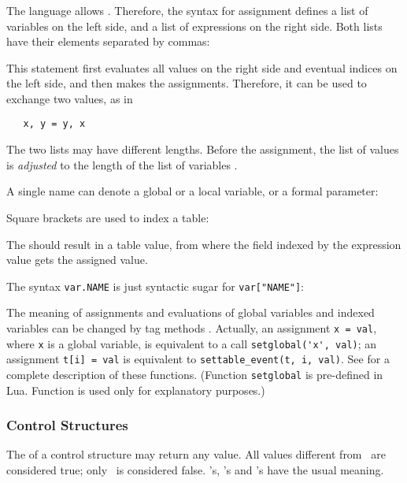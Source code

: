 \subsubsection{} \label{assignment}
The language allows .
Therefore, the syntax for assignment
defines a list of variables on the left side,
and a list of expressions on the right side.
Both lists have their elements separated by commas:
\begin{Produc}
\end{Produc}%
This statement first evaluates all values on the right side
and eventual indices on the left side,
and then makes the assignments.
Therefore, it can be used to exchange two values, as in
\begin{verbatim}
   x, y = y, x
\end{verbatim}
The two lists may have different lengths.
Before the assignment, the list of values is \emph{adjusted} to
the length of the list of variables .

A single name can denote a global or a local variable,
or a formal parameter:
\begin{Produc}
\end{Produc}%
Square brackets are used to index a table:
\begin{Produc}
\end{Produc}%
The  should result in a table value,
from where the field indexed by the expression
value gets the assigned value.

The syntax \verb|var.NAME| is just syntactic sugar for
\verb|var["NAME"]|:
\begin{Produc}
\end{Produc}%

The meaning of assignments and evaluations of global variables and
indexed variables can be changed by tag methods .
Actually,
an assignment \verb|x = val|, where \verb|x| is a global variable,
is equivalent to a call \verb|setglobal('x', val)|;
an assignment \verb|t[i] = val| is equivalent to
\verb|settable_event(t, i, val)|.
See  for a complete description of these functions.
(Function \verb|setglobal| is pre-defined in Lua.
Function  is used only for explanatory purposes.)

\subsubsection{Control Structures}
The  of a control structure may return any value.
All values different from \nil\ are considered true;
only \nil\ is considered false.
's, 's and 's have the usual meaning.

